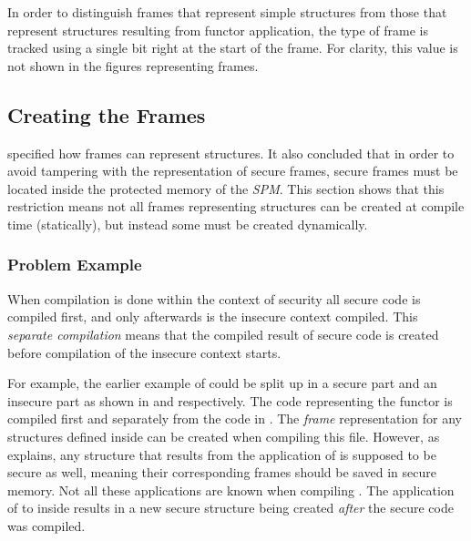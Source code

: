 In order to distinguish frames that represent simple structures from those that represent structures resulting from functor application, the type of frame is tracked using a single bit right at the start of the frame.
For clarity, this value is not shown in the figures representing frames.

\subsection{Creating the Frames}
\label{sec:creatingframes}
 specified how frames can represent structures.
It also concluded that in order to avoid tampering with the representation of secure frames, secure frames must be located inside the protected memory of the \emph{SPM}.
This section shows that this restriction means not all frames representing structures can be created at compile time (statically), but instead some must be created dynamically.

\subsubsection{Problem Example}
When compilation is done within the context of security all secure code is compiled first, and only afterwards is the insecure context compiled.
This \emph{separate compilation} means that the compiled result of secure code is created before compilation of the insecure context starts.

For example, the earlier example of  could be split up in a secure part and an insecure part as shown in  and  respectively.
The code representing the functor is compiled first and separately from the code in . 
The \emph{frame} representation for any structures defined inside  can be created when compiling this file.
However, as  explains, any structure that results from the application of  is supposed to be secure as well, meaning their corresponding frames should be saved in secure memory. 
Not all these applications are known when compiling .
The application of  to  inside  results in a new secure structure being created \emph{after} the secure code was compiled.

